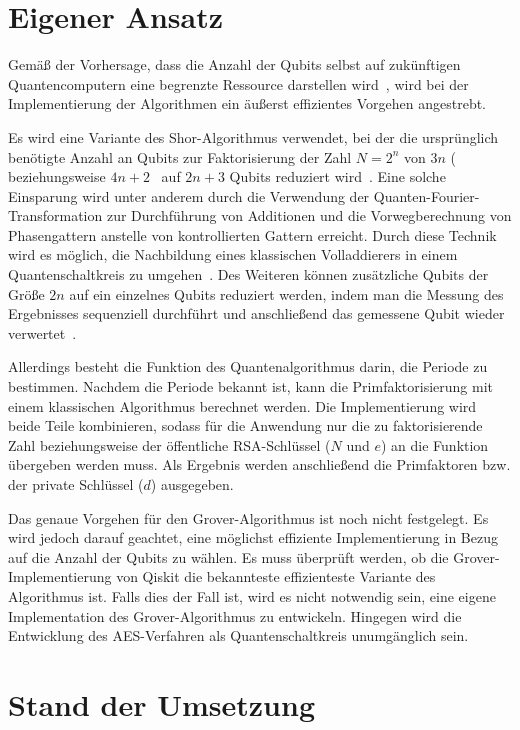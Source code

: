 \documentclass[
  a4paper, %
  10pt, %
  unnumberedsections, %
  twoside, %
]{LTJournalArticle}
\begin{document}
\section{Eigener Ansatz}

Gemäß der Vorhersage, dass die Anzahl der Qubits
selbst auf zukünftigen Quantencomputern eine begrenzte Ressource darstellen wird~\autocite{zalka1998fast},
wird bei der Implementierung der Algorithmen ein äußerst effizientes Vorgehen angestrebt.

Es wird eine Variante des Shor-Algorithmus verwendet,
bei der die ursprünglich benötigte Anzahl an Qubits zur Faktorisierung der Zahl
$N = 2^{n}$ von $3n$ (~\autocite{zalka1998fast} beziehungsweise
$4n+2$~\autocite{IBM:Shor_docu} auf $2n+3$ Qubits reduziert wird~\autocite{beauregard2003circuit}.
Eine solche Einsparung wird unter anderem durch
die Verwendung der Quanten-Fourier-Transformation zur Durchführung von Additionen und
die Vorwegberechnung von Phasengattern anstelle von kontrollierten Gattern erreicht.
Durch diese Technik wird es möglich,
die Nachbildung eines klassischen Volladdierers in einem Quantenschaltkreis zu umgehen~\autocite{draper2000addition}.
Des Weiteren können zusätzliche Qubits der Größe $2n$ auf ein einzelnes Qubits reduziert werden,
indem man die Messung des Ergebnisses sequenziell durchführt und anschließend das gemessene Qubit wieder verwertet~\autocite{Parker_2000}.

Allerdings besteht die Funktion des Quantenalgorithmus darin,
die Periode zu bestimmen.
Nachdem die Periode bekannt ist,
kann die Primfaktorisierung mit einem klassischen Algorithmus berechnet werden.
Die Implementierung wird beide Teile kombinieren,
sodass für die Anwendung nur die zu faktorisierende Zahl beziehungsweise
der öffentliche RSA-Schlüssel ($N$ und $e$) an die Funktion übergeben werden muss.
Als Ergebnis werden anschließend die Primfaktoren bzw. der private Schlüssel ($d$) ausgegeben.

Das genaue Vorgehen für den Grover-Algorithmus ist noch nicht festgelegt.
Es wird jedoch darauf geachtet, eine möglichst effiziente Implementierung in Bezug auf die Anzahl der Qubits zu wählen.
Es muss überprüft werden, ob die Grover-Implementierung von Qiskit die bekannteste effizienteste Variante des Algorithmus ist.
Falls dies der Fall ist, wird es nicht notwendig sein,
eine eigene Implementation des Grover-Algorithmus zu entwickeln.
Hingegen wird die Entwicklung des AES-Verfahren als Quantenschaltkreis unumgänglich sein.

\section{\LARGE Stand der Umsetzung}
\end{document}
